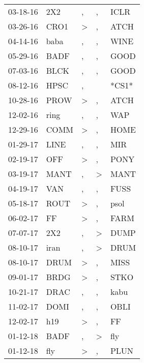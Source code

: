 \begin{supertabular}{lllll}
 03-18-16 &    2X2 &                , &                , &   ICLR \\
 03-26-16 &   CRO1 &     \textgreater &                , &   ATCH \\
 04-14-16 &   baba &                , &                , &   WINE \\
 05-29-16 &   BADF &                , &                , &   GOOD \\
 07-03-16 &   BLCK &                , &                , &   GOOD \\
 08-12-16 &   HPSC &                , &                  &  *CS1* \\
 10-28-16 &   PROW &     \textgreater &                , &   ATCH \\
 12-02-16 &   ring &                , &                , &    WAP \\
 12-29-16 &   COMM &     \textgreater &                , &   HOME \\
 01-29-17 &   LINE &                , &                , &    MIR \\
 02-19-17 &    OFF &     \textgreater &                , &   PONY \\
 03-19-17 &   MANT &                , &     \textgreater &   MANT \\
 04-19-17 &    VAN &                , &                , &   FUSS \\
 05-18-17 &   ROUT &     \textgreater &                , &   psol \\
 06-02-17 &     FF &     \textgreater &                , &   FARM \\
 07-07-17 &    2X2 &                , &     \textgreater &   DUMP \\
 08-10-17 &   iran &                , &     \textgreater &   DRUM \\
 08-10-17 &   DRUM &     \textgreater &                , &   MISS \\
 09-01-17 &   BRDG &     \textgreater &                , &   STKO \\
 10-21-17 &   DRAC &                , &                , &   kabu \\
 11-02-17 &   DOMI &                , &                , &   OBLI \\
 12-02-17 &    h19 &     \textgreater &                , &     FF \\
 01-12-18 &   BADF &                , &     \textgreater &    fly \\
 01-12-18 &    fly &     \textgreater &                , &   PLUN \\

\end{supertabular}
